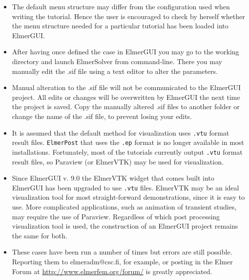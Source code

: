 \begin{itemize}
%
\item The default menu structure may differ from the configuration used when writing the tutorial. Hence the user is encouraged to check by herself whether the menu structure needed for a particular tutorial has been loaded into ElmerGUI. 
%
\item After having once defined the case in ElmerGUI you may go to the working directory and launch ElmerSolver from command-line. There you may manually edit the .sif file using a text editor to alter the parameters.
%
\item Manual alteration to the .sif file will not be communicated to the ElmerGUI project. All edits or changes will be overwritten by ElmerGUI the next time the project is saved.  Copy the manually altered .sif files to another folder or change the name of the .sif file, to prevent losing your edits.
%
\item It is assumed that the default method for visualization uses \texttt{.vtu} format result files.  \texttt{ElmerPost} that uses the \texttt{.ep} format is no longer available in most installations.  Fortunately, most of the tutorials currently output \texttt{.vtu} format result files, so Paraview (or ElmerVTK) may be used for visualization.
  
\item Since ElmerGUI v. 9.0 the ElmerVTK widget that comes built into ElmerGUI has been upgraded to use \texttt{.vtu} files. ElmerVTK may be an ideal visualization tool for most straight-forward demonstrations, since it is easy to use.  More complicated applications, such as animation of transient studies, may require the use of Paraview.  Regardless of which post processing visualization tool is used, the construction of an ElmerGUI project remains the same for both.
%
\item These cases have been run a number of times but errors are still possible.  Reporting them to elmeradm@csc.fi, for example, or posting in the Elmer Forum at \url{http://www.elmerfem.org/forum/} is greatly appreciated. 
\end{itemize}







